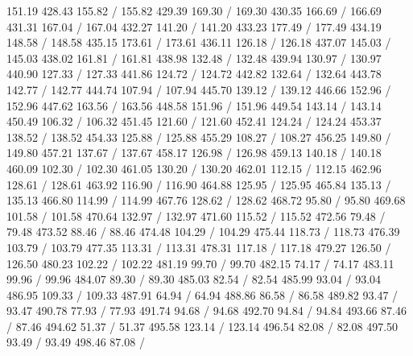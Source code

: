 { 151.19 428.43 155.82 /
 155.82 429.39 169.30 /
 169.30 430.35 166.69 /
 166.69 431.31 167.04 /
 167.04 432.27 141.20 /
 141.20 433.23 177.49 /
 177.49 434.19 148.58 /
 148.58 435.15 173.61 /
 173.61 436.11 126.18 /
 126.18 437.07 145.03 /
 145.03 438.02 161.81 /
 161.81 438.98 132.48 /
 132.48 439.94 130.97 /
 130.97 440.90 127.33 /
 127.33 441.86 124.72 /
 124.72 442.82 132.64 /
 132.64 443.78 142.77 /
 142.77 444.74 107.94 /
 107.94 445.70 139.12 /
 139.12 446.66 152.96 /
 152.96 447.62 163.56 /
 163.56 448.58 151.96 /
 151.96 449.54 143.14 /
 143.14 450.49 106.32 /
 106.32 451.45 121.60 /
 121.60 452.41 124.24 /
 124.24 453.37 138.52 /
 138.52 454.33 125.88 /
 125.88 455.29 108.27 /
 108.27 456.25 149.80 /
 149.80 457.21 137.67 /
 137.67 458.17 126.98 /
 126.98 459.13 140.18 /
 140.18 460.09 102.30 /
 102.30 461.05 130.20 /
 130.20 462.01 112.15 /
 112.15 462.96 128.61 /
 128.61 463.92 116.90 /
 116.90 464.88 125.95 /
 125.95 465.84 135.13 /
 135.13 466.80 114.99 /
 114.99 467.76 128.62 /
 128.62 468.72 95.80 /
 95.80 469.68 101.58 /
 101.58 470.64 132.97 /
 132.97 471.60 115.52 /
 115.52 472.56 79.48 /
 79.48 473.52 88.46 /
 88.46 474.48 104.29 /
 104.29 475.44 118.73 /
 118.73 476.39 103.79 /
 103.79 477.35 113.31 /
 113.31 478.31 117.18 /
 117.18 479.27 126.50 /
 126.50 480.23 102.22 /
 102.22 481.19 99.70 /
 99.70 482.15 74.17 /
 74.17 483.11 99.96 /
 99.96 484.07 89.30 /
 89.30 485.03 82.54 /
 82.54 485.99 93.04 /
 93.04 486.95 109.33 /
 109.33 487.91 64.94 /
 64.94 488.86 86.58 /
 86.58 489.82 93.47 /
 93.47 490.78 77.93 /
 77.93 491.74 94.68 /
 94.68 492.70 94.84 /
 94.84 493.66 87.46 /
 87.46 494.62 51.37 /
 51.37 495.58 123.14 /
 123.14 496.54 82.08 /
 82.08 497.50 93.49 /
 93.49 498.46 87.08 /
}
